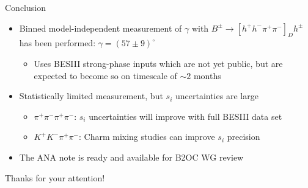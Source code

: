 \documentclass[xcolor={dvipsnames}]{beamer}
\begin{document}
\begin{frame}{Conclusion}
  \vspace{0.6cm}
  \begin{itemize}
    \setlength\itemsep{1.5em}
    \item{Binned model-independent measurement of $\gamma$ with $B^\pm\to[h^+h^-\pi^+\pi^-]_Dh^\pm$ has been performed: $\gamma = (57 \pm 9)^\circ$}
    \begin{itemize}
      \item{Uses BESIII strong-phase inputs which are not yet public, but are expected to become so on timescale of $\sim2$ months}
    \end{itemize}
    \item{Statistically limited measurement, but $s_i$ uncertainties are large}
    \begin{itemize}
      \item{$\pi^+\pi^-\pi^+\pi^-$: $s_i$ uncertainties will improve with full BESIII data set}
      \item{$K^+K^-\pi^+\pi^-$: Charm mixing studies can improve $s_i$ precision}
    \end{itemize}
    \item{The ANA note is ready and available for B2OC WG review}
  \end{itemize}
  \vspace{0.2cm}
  \begin{center}
    {\huge Thanks for your attention!}
  \end{center}
\end{frame}
\end{document}
